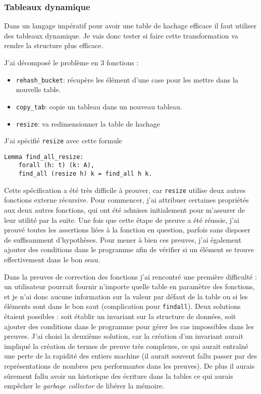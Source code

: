 \documentclass{article}
\begin{document}
  \subsubsection{Tableaux dynamique}


  Dans un langage impératif pour avoir une table de hachage efficace il faut
utiliser des tableaux dynamique. Je vais donc tester si faire cette
transformation va rendre la structure plus efficace.

J'ai décomposé le problème en 3 fonctions :

\begin{itemize}
  \item \texttt{rehash\_bucket}: récupère les élément d'une case pour les mettre
    dans la nouvelle table.
  \item \texttt{copy\_tab}: copie un tableau dans un nouveau tableau.
  \item \texttt{resize}: va redimensionner la table de hachage
\end{itemize}

J'ai spécifié \texttt{resize} avec cette formule

\begin{lstlisting}[language=Coq]
  Lemma find_all_resize:
    forall (h: t) (k: A),
    find_all (resize h) k = find_all h k.
\end{lstlisting}

  Cette spécification a été très difficile à prouver, car \texttt{resize}
utilise deux autres fonctions externe récursive. Pour
commencer, j'ai attribuer certaines propriétés aux deux autres
fonctions, qui ont été admises initialement pour m'assurer de leur utilité
par la suite. Une fois que cette étape de preuve a été réussie, j'ai
prouvé toutes les assertions liées à la fonction en question, parfois sans
disposer de suffisamment d'hypothèses. Pour mener à bien ces preuves, j'ai
également ajouter des conditions dans le programme afin de vérifier
si un élément se trouve effectivement dans le bon seau.

  Dans la preuves de correction des fonctions j'ai rencontré une première
difficulté : un utilisateur pourrait fournir n'importe quelle table en paramètre
des fonctions, et je n'ai donc aucune information sur la valeur par défaut de
la table ou si les éléments sont dans le bon saut (complication pour
\texttt{findall}). Deux solutions étaient possibles : soit établir un invariant
sur la structure de données, soit ajouter des conditions dans le programme pour
gérer les cas impossibles dans les preuves. J'ai choisi la deuxième solution,
car la création d'un invariant aurait impliqué la création de termes de preuve
très complexes, ce qui aurait entraîné une perte de la rapidité des entiers
machine (il aurait souvent fallu passer par des représentations de nombres peu
performantes dans les preuves). De plus il aurais sûrement fallu avoir un
historique des écriture dans la tables ce qui aurais empêcher le \textit{garbage
collector} de libérer la mémoire.
\end{document}
